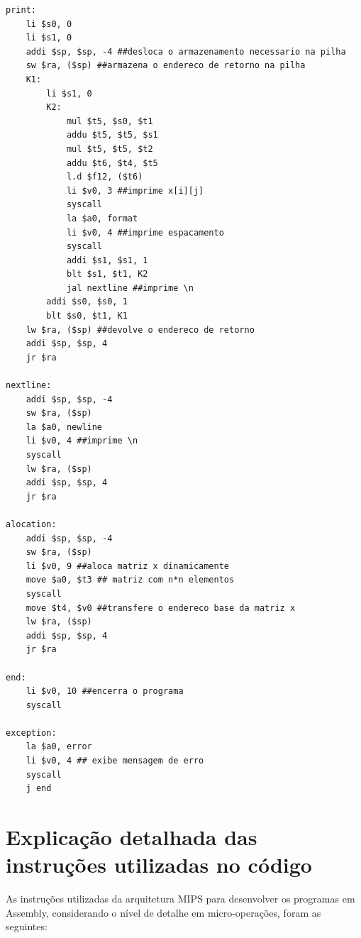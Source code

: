 \documentclass[
	12pt,				%
	oneside,			%
	a4paper,			%
	english,			%
	brazil				%
	]{abntex2ppgsi}
\begin{document}
\begin{lstlisting}[language={[x86masm]Assembler}, caption=Resolução em baixo nível do exercício 27.C]
print:
    li $s0, 0
    li $s1, 0
    addi $sp, $sp, -4 ##desloca o armazenamento necessario na pilha
    sw $ra, ($sp) ##armazena o endereco de retorno na pilha
    K1:
        li $s1, 0	
        K2:
            mul $t5, $s0, $t1
            addu $t5, $t5, $s1
            mul $t5, $t5, $t2
            addu $t6, $t4, $t5
            l.d $f12, ($t6)
            li $v0, 3 ##imprime x[i][j]
            syscall
            la $a0, format
            li $v0, 4 ##imprime espacamento
            syscall
            addi $s1, $s1, 1
            blt $s1, $t1, K2
            jal nextline ##imprime \n
        addi $s0, $s0, 1
        blt $s0, $t1, K1
    lw $ra, ($sp) ##devolve o endereco de retorno
    addi $sp, $sp, 4
    jr $ra

nextline:
    addi $sp, $sp, -4
    sw $ra, ($sp)
    la $a0, newline
    li $v0, 4 ##imprime \n
    syscall
    lw $ra, ($sp)
    addi $sp, $sp, 4
    jr $ra
	
alocation:
    addi $sp, $sp, -4
    sw $ra, ($sp)
    li $v0, 9 ##aloca matriz x dinamicamente
    move $a0, $t3 ## matriz com n*n elementos
    syscall
    move $t4, $v0 ##transfere o endereco base da matriz x
    lw $ra, ($sp)
    addi $sp, $sp, 4
    jr $ra

end:
    li $v0, 10 ##encerra o programa
    syscall	

exception:
    la $a0, error
    li $v0, 4 ## exibe mensagem de erro
    syscall
    j end			
\end{lstlisting}

\chapter{Explicação detalhada das instruções utilizadas no código}
As instruções utilizadas da arquitetura MIPS para desenvolver os programas em Assembly, considerando o nível de detalhe em micro-operações, foram as seguintes:
\end{document}
